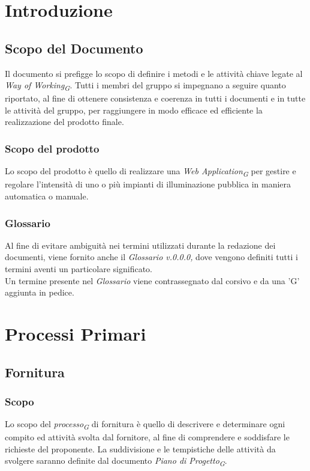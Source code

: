 \documentclass[a4paper, 12pt]{article}
\begin{document}
\makeindexdetails
\makefrontpage \makeversioni
\tableofcontents
\newpage
\clearpage
{} 

\section{Introduzione}
\subsection{Scopo del Documento}
Il documento si prefigge lo scopo di definire i metodi e le attività chiave
legate al \textit{Way of Working}\textsubscript{\textit{G}}. Tutti i membri del gruppo si impegnano a
seguire quanto riportato, al fine di ottenere consistenza e coerenza in tutti i
documenti e in tutte le attività del gruppo, per raggiungere in modo efficace ed
efficiente la realizzazione del prodotto finale.

\subsubsection{Scopo del prodotto}
Lo scopo del prodotto è quello di realizzare una \textit{Web Application}\textsubscript{\textit{G}} per
gestire e regolare l'intensità di uno o più impianti di illuminazione pubblica
in maniera automatica o manuale.

\subsubsection{Glossario}
Al fine di evitare ambiguità nei termini utilizzati durante la redazione dei
documenti, viene fornito anche il \textit{Glossario v.0.0.0,} dove vengono
definiti tutti i termini aventi un particolare significato. \\
Un termine presente nel \textit{Glossario} viene contrassegnato dal corsivo e
da una 'G' aggiunta in pedice.
\newpage

\section{Processi Primari}
\subsection{Fornitura}
\subsubsection{Scopo}
Lo scopo del \textit{processo}\textsubscript{\textit{G}} di fornitura è quello di descrivere e determinare ogni
compito ed attività svolta dal fornitore, al fine di comprendere e soddisfare le
richieste del proponente. 
La suddivisione e le tempistiche delle attività da svolgere saranno definite dal documento
\textit{Piano di Progetto}\textsubscript{\textit{G}}.
\end{document}
